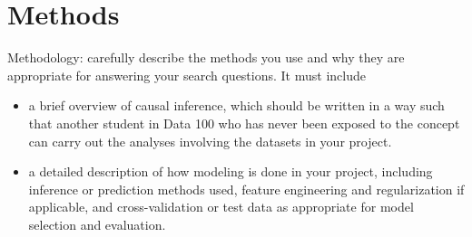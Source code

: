 \section{Methods}
Methodology: carefully describe the methods you use and why they are appropriate for answering your search questions. It must include
\begin{itemize}
    \item a brief overview of causal inference, which should be written in a way such that another student in Data 100 who has never been exposed to the concept can carry out the analyses involving the datasets in your project.
    \item a detailed description of how modeling is done in your project, including inference or prediction methods used, feature engineering and regularization if applicable, and cross-validation or test data as appropriate for model selection and evaluation.
\end{itemize}

